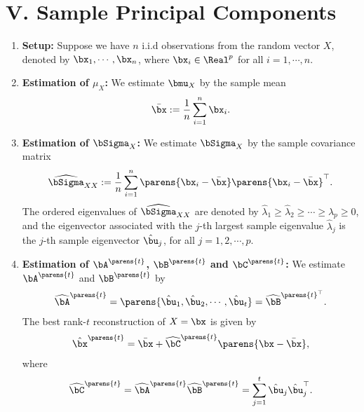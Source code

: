 \documentclass[12pt]{article}
\begin{document}
\section*{V. Sample Principal Components}

\begin{enumerate}[label=\textbf{\arabic*.}]

	\item \textbf{Setup:} Suppose we have $n$ i.i.d observations from the random vector $X$, denoted by $\bx_1, \cdots, \bx_n$, where $\bx_i \in \Real^p$ for all $i = 1, \cdots, n$. 
	
	\item \textbf{Estimation of $\mu_X$:} We estimate $\bmu_X$ by the sample mean 
	\begin{align*}
		\bar{\bx} := \frac{1}{n} \sum_{i=1}^n \bx_i. 
	\end{align*}
	
	\item \textbf{Estimation of $\bSigma_X$:} We estimate $\bSigma_X$ by the sample covariance matrix 
	\begin{align*}
		\widehat{\bSigma}_{XX} := \frac{1}{n} \sum_{i=1}^n \parens{\bx_i - \bar{\bx}} \parens{\bx_i - \bar{\bx}}^\top. 
	\end{align*}
	The ordered eigenvalues of $\widehat{\bSigma}_{XX}$ are denoted by $\hat{\lambda}_1 \ge \hat{\lambda}_2 \ge \cdots \ge \hat{\lambda}_p \ge 0$, and the eigenvector associated with the $j$-th largest sample eigenvalue $\hat{\lambda}_j$ is the $j$-th sample eigenvector $\hat{\bu}_j$, for all $j = 1, 2, \cdots, p$. 
	
	\item \textbf{Estimation of $\bA^{\parens{t}}$, $\bB^{\parens{t}}$ and $\bC^{\parens{t}}$:} We estimate $\bA^{\parens{t}}$ and $\bB^{\parens{t}}$ by
	\begin{align*}
		\widehat{\bA}^{\parens{t}} = \parens{\hat{\bu}_1, \hat{\bu}_2, \cdots, \hat{\bu}_t} = \widehat{\bB}^{\parens{t}^\top}. 
	\end{align*}
	The best rank-$t$ reconstruction of $X = \bx$ is given by
	\begin{align*}
		\hat{\bx}^{\parens{t}} = \bar{\bx} + \widehat{\bC}^{\parens{t}} \parens{\bx - \bar{\bx}}, 
	\end{align*}
	where 
	\begin{align*}
		\widehat{\bC}^{\parens{t}} = \widehat{\bA}^{\parens{t}} \widehat{\bB}^{\parens{t}} = \sum_{j=1}^t \hat{\bu}_j \hat{\bu}_j^\top. 
	\end{align*}
	

\end{enumerate}
\end{document}
